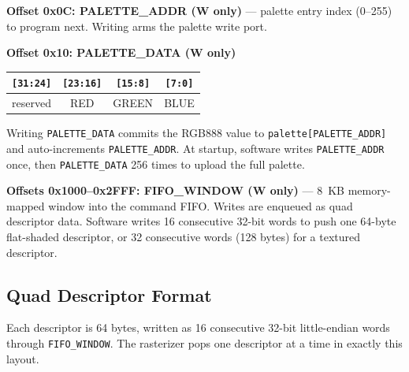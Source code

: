 \documentclass[11pt]{article}
\begin{document}
\vspace{0.5em}
\noindent\textbf{Offset 0x0C: PALETTE\_ADDR (W only)} --- palette entry index (0--255) to program next. Writing arms the palette write port.

\vspace{0.5em}
\noindent\textbf{Offset 0x10: PALETTE\_DATA (W only)}

\begin{center}
\begin{tabular}{|c|c|c|c|}
\hline
\texttt{[31:24]} & \texttt{[23:16]} & \texttt{[15:8]} & \texttt{[7:0]} \\
\hline
reserved & RED & GREEN & BLUE \\
\hline
\end{tabular}
\end{center}

Writing \texttt{PALETTE\_DATA} commits the RGB888 value to \texttt{palette[PALETTE\_ADDR]} and auto-increments \texttt{PALETTE\_ADDR}. At startup, software writes \texttt{PALETTE\_ADDR} once, then \texttt{PALETTE\_DATA} 256 times to upload the full palette.

\vspace{0.5em}
\noindent\textbf{Offsets 0x1000--0x2FFF: FIFO\_WINDOW (W only)} --- 8~KB memory-mapped window into the command FIFO. Writes are enqueued as quad descriptor data. Software writes 16 consecutive 32-bit words to push one 64-byte flat-shaded descriptor, or 32 consecutive words (128 bytes) for a textured descriptor.

\subsection{Quad Descriptor Format}
\label{sec:quaddesc}

Each descriptor is 64 bytes, written as 16 consecutive 32-bit little-endian words through \texttt{FIFO\_WINDOW}. The rasterizer pops one descriptor at a time in exactly this layout.
\end{document}

